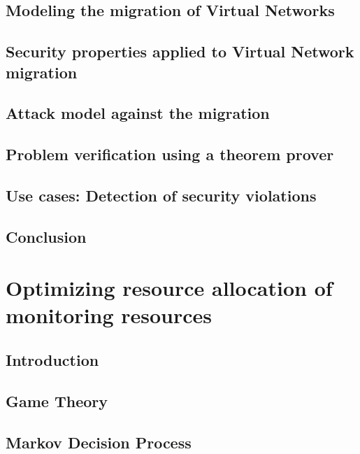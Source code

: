 \documentclass[a4paper, 11pt]{article}
\begin{document}
\subsection{Modeling the migration of Virtual Networks}


\subsection{Security properties applied to Virtual Network migration}


\subsection{Attack model against the migration}


\subsection{Problem verification using a theorem prover}


\newpage
\subsection{Use cases: Detection of security violations}


\newpage
\subsection{Conclusion}


\newpage
\section{Optimizing resource allocation of monitoring resources}
\label{sec:RAprob}
\subsection{Introduction}


\newpage
\subsection{Game Theory}


\newpage
\subsection{Markov Decision Process}


\newpage

\newpage
{}


\newpage
\begin{appendices}

\newpage
% 
\newpage

\end{appendices}
\end{document}
